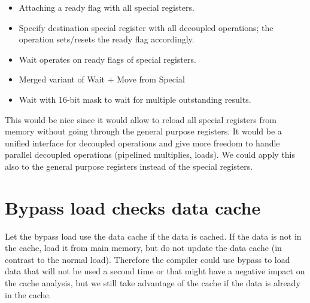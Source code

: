 \documentclass[a4paper,fontsize=10pt,twoside,DIV15,BCOR12mm,headinclude=true,footinclude=false,pagesize,bibtotoc]{scrbook}
\newcommand{\comment}[3]{

\textsf{\textbf{#1}} {\color{#3}#2}}
\newcommand{\stefan}[1]{\comment{Stefan}{#1}{RoyalPurple}}
\renewcommand{\stefan}[1]{}
\begin{document}
\begin{itemize}
  \item Attaching a ready flag with all special registers.
  \item Specify destination special register with all decoupled operations; the
        operation sets/resets the ready flag accordingly.
  \item Wait operates on ready flags of special registers.
  \item Merged variant of Wait + Move from Special
  \item Wait with 16-bit mask to wait for multiple outstanding results.
\end{itemize}

This would be nice since it would allow to reload all special registers from
memory without going through the general purpose registers. It would be a
unified interface for decoupled operations and give more freedom to handle
parallel decoupled operations (pipelined multiplies, loads). We could apply this
also to the general purpose registers instead of the special registers.

\stefan{I think it makes more sense to use the ready flags with the general purpose registers. Then we can simply replace
all blocking and decoupled loads with special move by one unified load to a general purpose register. This however means
that all operations can potentially stall.}

\stefan{Regarding having additional write ports for the register file: We could still disallow multiple parallel loads by stalling a load
instruction until the last memory op is completed (else we would also need to take some special care of stores if loads and stores can be in progress at the same
time), this would not be any worse than the current ISA (currently we cannot have multiple loads to main memory in parallel). If a load is
ready, I guess we could just stall the pipeline for one cycle to write to the register. Again, this may still be better than the
current ISA, since we do not need the code space for the additional move from special instruction, but it may cost one stall whereas the
move-from-special could be scheduled in the second slot parallel to some other operation (ok, but then its not so RISC anymore..).}

\section{Bypass load checks data cache}

Let the bypass load use the data cache if the data is cached. If the data is not in the cache, load it from main memory, but do not update
the data cache (in contrast to the normal load). Therefore the compiler could use bypass to load data that will not be used a second time or
that might have a negative impact on the cache analysis, but we still take advantage of the cache if the data is already in the cache.
\end{document}
